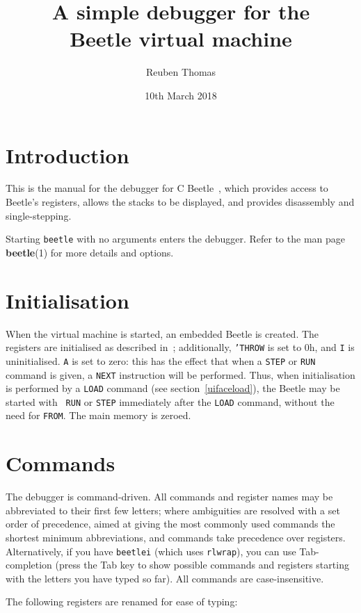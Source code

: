 \documentclass[english]{article}
\title{A simple debugger for the\\Beetle virtual machine}
\author{Reuben Thomas}
\date{10th March 2018}
\begin{document}
\maketitle


\section{Introduction}

This is the manual for the debugger for C Beetle~\cite{cbeetle}, which provides access to Beetle's registers, allows the stacks to be displayed, and provides disassembly and single-stepping.

Starting {\tt beetle} with no arguments enters the debugger. Refer to the man page \textbf{beetle}(1) for more details and options.


\section{Initialisation}
\label{uifaceinit}

When the virtual machine is started, an embedded Beetle is created. The registers are initialised as described in~\cite[section~\ref{usingcalls}]{cbeetle}; additionally, {\tt 'THROW} is set to 0h, and {\tt I} is uninitialised. {\tt A} is set to zero: this has the effect that when a {\tt STEP} or {\tt RUN} command is given, a {\tt NEXT} instruction
will be performed. Thus, when initialisation is performed by a {\tt LOAD}
command (see section~\ref{uifaceload}), the Beetle may be started with {\tt
RUN} or {\tt STEP} immediately after the {\tt LOAD} command, without the need
for {\tt FROM}. The main memory is zeroed.


\section{Commands}
\label{commands}

The debugger is command-driven. All commands and register names may be
abbreviated to their first few letters; where ambiguities are resolved with a set order of precedence, aimed at giving the most
commonly used commands the shortest minimum abbreviations, and commands
take precedence over registers.
Alternatively, if you have {\tt beetlei} (which uses {\tt rlwrap}), you can use Tab-completion (press the Tab key to show possible commands and registers starting with the letters you have typed so far).
All commands are case-insensitive.

The following registers are renamed for ease of typing:
\end{document}
